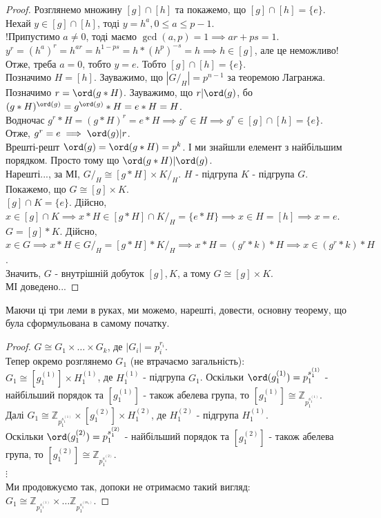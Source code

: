 \documentclass{math_library}
\begin{document}
\begin{proof}
Розглянемо множину $[g] \cap [h]$ та покажемо, що $[g] \cap [h] = \{e\}$.\\
Нехай $y \in [g] \cap [h]$, тоді $y = h^a, 0 \leq a \leq p-1$.\\
!Припустимо $a \neq 0$, тоді маємо $\gcd(a,p) = 1 \implies ar+ps=1$.\\
$y^r = (h^a)^r = h^{ar} = h^{1-ps} = h*(h^{p})^{-s} = h \implies h \in [g]$, але це неможливо!\\
Отже, треба $a = 0$, тобто $y = e$. Тобто $[g] \cap [h] = \{e\}$.\\
Позначимо $H = [h]$. Зауважимо, що $|G/_H| = p^{n-1}$ за теоремою Лагранжа. Позначимо $r = \ord(g*H)$. Зауважимо, що $r | \ord(g)$, бо\\
$(g*H)^{\ord(g)} = g^{\ord(g)}*H = e*H = H$.\\
Водночас $g^r*H = (g*H)^r = e*H \implies g^r \in H \implies g^r \in [g] \cap [h] = \{e\}$.\\
Отже, $g^r = e \implies \ord(g) | r$.\\
Врешті-решт $\ord(g) = \ord(g*H) = p^k$. І ми знайшли елемент з найбільшим порядком. Просто тому що $\ord(g*H) | \ord(g)$.\\
Нарешті..., за МІ, $G/_H \cong [g*H] \times K/_H$. $H$ - підгрупа $K$ - підгрупа $G$.\\
Покажемо, що $G \cong [g] \times K$.\\
$[g] \cap K = \{e\}$. Дійсно, $x \in [g] \cap K \implies x*H \in [g*H] \cap K/_H = \{e*H\} \implies x \in H = [h] \implies x = e$.\\
$G = [g]*K$. Дійсно, $x \in G \implies x*H \in G/_H = [g*H]*K/_H \implies x*H = (g^r*k)*H \implies x \in (g^r*k)*H$.\\
Значить, $G$ - внутрішній добуток $[g],K$, а тому $G \cong [g] \times K$.\\
МІ доведено...
\end{proof}

Маючи ці три леми в руках, ми можемо, нарешті, довести, основну теорему, що була сформульована в самому початку.
\begin{proof}
$G \cong G_1 \times \dots \times G_k$, де $|G_i| = p_i^{r_i}$.\\
Тепер окремо розглянемо $G_1$ (не втрачаємо загальність):\\
$G_1 \cong [g_1^{(1)}] \times H_1^{(1)}$, де $H_1^{(1)}$ - підгрупа $G_1$. Оскільки $\ord(g_1^{(1)}) = p_1^{s_1^{(1)}}$ - найбільший порядок та $[g_1^{(1)}]$ - також абелева група, то $[g_1^{(1)}] \cong \mathbb{Z}_{p_1^{s_1^{(1)}}}$.\\
Далі $G_1 \cong \mathbb{Z}_{p_1^{s_1^{(1)}}} \times [g_1^{(2)}] \times H_1^{(2)}$, де $H_1^{(2)}$ - підгрупа $H_1^{(1)}$.\\
Оскільки $\ord(g_1^{(2)}) = p_1^{s_1^{(2)}}$ - найбільший порядок та $[g_1^{(2)}]$ - також абелева група, то $[g_1^{(2)}] \cong \mathbb{Z}_{p_1^{s_1^{(2)}}}$.\\
$\vdots$\\
Ми продовжуємо так, допоки не отримаємо такий вигляд:\\
$G_1 \cong \mathbb{Z}_{p_1^{s_1^{(1)}}} \times \dots \mathbb{Z}_{p_1^{s_1^{(m_1)}}}$.
\end{proof}
\end{document}
